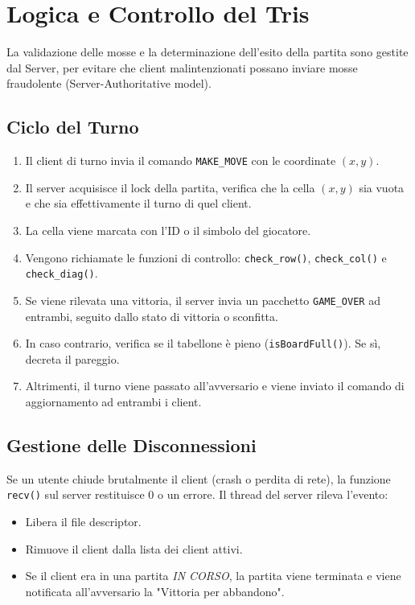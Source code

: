 \documentclass[11pt, a4paper]{article}
\begin{document}
\section{Logica e Controllo del Tris}

La validazione delle mosse e la determinazione dell'esito della partita sono gestite dal Server, per evitare che client malintenzionati possano inviare mosse fraudolente (Server-Authoritative model).

\subsection{Ciclo del Turno}
\begin{enumerate}
    \item Il client di turno invia il comando \texttt{MAKE\_MOVE} con le coordinate $(x, y)$.
    \item Il server acquisisce il lock della partita, verifica che la cella $(x, y)$ sia vuota e che sia effettivamente il turno di quel client.
    \item La cella viene marcata con l'ID o il simbolo del giocatore.
    \item Vengono richiamate le funzioni di controllo: \texttt{check\_row()}, \texttt{check\_col()} e \texttt{check\_diag()}.
    \item Se viene rilevata una vittoria, il server invia un pacchetto \texttt{GAME\_OVER} ad entrambi, seguito dallo stato di vittoria o sconfitta.
    \item In caso contrario, verifica se il tabellone è pieno (\texttt{isBoardFull()}). Se sì, decreta il pareggio.
    \item Altrimenti, il turno viene passato all'avversario e viene inviato il comando di aggiornamento ad entrambi i client.
\end{enumerate}

\subsection{Gestione delle Disconnessioni}
Se un utente chiude brutalmente il client (crash o perdita di rete), la funzione \texttt{recv()} sul server restituisce 0 o un errore. Il thread del server rileva l'evento:
\begin{itemize}
    \item Libera il file descriptor.
    \item Rimuove il client dalla lista dei client attivi.
    \item Se il client era in una partita \textit{IN CORSO}, la partita viene terminata e viene notificata all'avversario la "Vittoria per abbandono".
\end{itemize}
\end{document}
